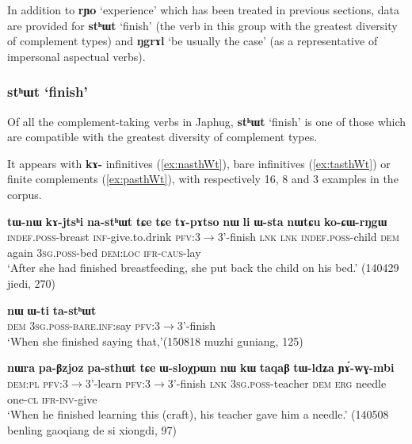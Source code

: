 \documentclass[oneside,a4paper,11pt]{article}
\newcommand{\ipa}[1]{\textbf{\phon#1}} %
\newcommand{\jpg}[2]{\ipa{#1} `#2'} %
\begin{document}
In addition to \jpg{rɲo}{experience} which has been treated in previous sections, data are provided for \jpg{stʰɯt}{finish} (the verb in this group with the greatest diversity of complement types) and \jpg{ŋgrɤl}{be usually the case} (as a representative of impersonal aspectual verbs).

\subsubsection{\jpg{stʰɯt}{finish}}
Of all the complement-taking verbs in Japhug, \jpg{stʰɯt}{finish} is one of those which are compatible with the greatest diversity of complement types.

It appears with \ipa{kɤ-} infinitives (\ref{ex:nasthWt}), bare infinitives (\ref{ex:tasthWt}) or finite complements (\ref{ex:pasthWt}), with respectively 16, 8 and 3 examples in the corpus. 

\begin{exe}
\ex \label{ex:nasthWt}
\gll \ipa{tɯ-nɯ} 	\ipa{kɤ-jtsʰi} 	\ipa{na-stʰɯt} 	\ipa{tɕe} 	\ipa{tɕe} 	\ipa{tɤ-pɤtso} 	\ipa{nɯ} 	\ipa{li} 	\ipa{ɯ-sta} 	\ipa{nɯtɕu} 	\ipa{ko-ɕɯ-rŋgɯ} 	\\
\textsc{indef.poss}-breast \textsc{inf}-give.to.drink \textsc{pfv}:3$\rightarrow$3'-finish \textsc{lnk} \textsc{lnk} \textsc{indef.poss}-child \textsc{dem} again \textsc{3sg.poss}-bed \textsc{dem:loc} \textsc{ifr-caus}-lay \\
\glt `After she had finished breastfeeding, she put back the child on his bed.' (140429 jiedi, 270)
\end{exe}

\begin{exe}
\ex \label{ex:tasthWt}
\gll
\ipa{nɯ} 	\ipa{ɯ-ti} 	\ipa{ta-stʰɯt} \\
\textsc{dem} \textsc{3sg.poss-bare.inf}:say \textsc{pfv}:3$\rightarrow$3'-finish \\
\glt `When she finished saying that,'(150818 muzhi guniang, 125)
\end{exe}

\begin{exe}
\ex \label{ex:pasthWt}
\gll 	\ipa{nɯra} 	\ipa{pa-βzjoz}	\ipa{pa-sthɯt} \ipa{tɕe} \ipa{ɯ-sloχpɯn} 	\ipa{nɯ} 	\ipa{kɯ} 	\ipa{taqaβ} 	\ipa{tɯ-ldʑa} 	\ipa{ɲɤ́-wɣ-mbi} 
\\
 \textsc{dem:pl} \textsc{pfv}:3$\rightarrow$3'-learn \textsc{pfv}:3$\rightarrow$3'-finish \textsc{lnk} \textsc{3sg.poss}-teacher \textsc{dem} \textsc{erg} needle one-\textsc{cl} \textsc{ifr-inv}-give  \\
\glt `When he finished learning this (craft), his teacher gave him a needle.' (140508 benling gaoqiang de si xiongdi, 97)
\end{exe} 
\end{document}
